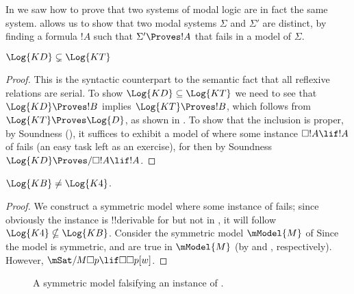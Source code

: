 \documentclass[../../../include/open-logic-section]{subfiles}
\begin{document}


In  we saw how to prove that two systems of modal
logic are in fact the same system.  allows
us to show that two modal systems $\Sigma$ and $\Sigma'$ are distinct,
by finding a formula $!A$ such that $\Sigma' \Proves !A$ that fails in
a model of $\Sigma$.

\begin{prop}
  $\Log{KD} \subsetneq \Log{KT}$
\end{prop}

\begin{proof} This is the syntactic counterpart to the semantic fact
  that all reflexive relations are serial. To show $\Log{KD} \subseteq
  \Log{KT}$ we need to see that $\Log{KD} \Proves !B$ implies
  $\Log{KT} \Proves !B$, which follows from $\Log{KT} \Proves
  \Log{D}$, as shown in
  .  To show
  that the inclusion is proper, by Soundness
  (), it suffices to exhibit a model of
   where some instance $\Box !A \lif !A$ of  fails (an
  easy task left as an exercise), for then by Soundness $\Log{KD}
  \Proves/ \Box !A \lif !A$.
\end{proof}

\begin{prop}
  $\Log{KB} \neq \Log{K4}$. 
\end{prop}

\begin{proof}
  We construct a symmetric model where some instance of  fails;
  since obviously the instance is !!{derivable} for  but not
  in , it will follow $\Log{K4} \nsubseteq \Log{KB}$.
  Consider the symmetric model $\mModel{M}$ of  Since
  the model is symmetric,  and  are true in $\mModel{M}$
  (by  and
  , respectively). However,
  $\mSat/{M}{\Box p \lif \Box\Box p}[w]$.
\end{proof}

\begin{figure}[htpb]
  \centering
  \caption{A symmetric model falsifying an instance of .}
\end{figure}
 
\end{document}
